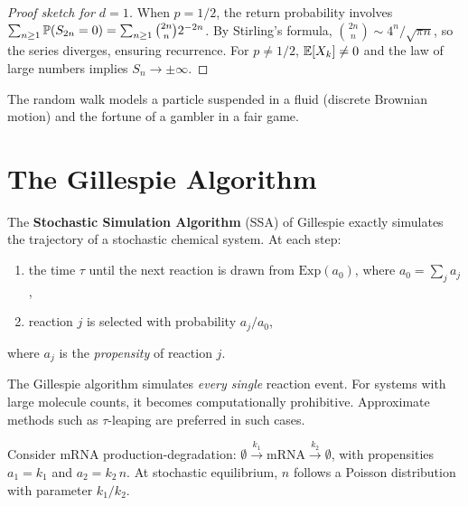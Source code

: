 \begin{proof}[Proof sketch for $d=1$]
When $p = 1/2$, the return probability involves
$\sum_{n \geq 1} \mathbb{P}(S_{2n} = 0) = \sum_{n \geq 1} \binom{2n}{n} 2^{-2n}$.
By Stirling's formula, $\binom{2n}{n} \sim 4^n/\sqrt{\pi n}$, so the
series diverges, ensuring recurrence. For $p \neq 1/2$, $\mathbb{E}[X_k] \neq 0$
and the law of large numbers implies $S_n \to \pm\infty$.
\end{proof}

\begin{example}
The random walk models a particle suspended in a fluid (discrete Brownian
motion) and the fortune of a gambler in a fair game.
\end{example}

\section{The Gillespie Algorithm}
\label{sec:gillespie}

\begin{definition}
The \textbf{Stochastic Simulation Algorithm} (SSA) of Gillespie exactly
simulates the trajectory of a stochastic chemical system. At each step:
\begin{enumerate}
  \item the time $\tau$ until the next reaction is drawn from
    $\text{Exp}(a_0)$, where $a_0 = \sum_j a_j$,
  \item reaction $j$ is selected with probability $a_j / a_0$,
\end{enumerate}
where $a_j$ is the \emph{propensity} of reaction $j$.
\end{definition}

\begin{attention}
The Gillespie algorithm simulates \emph{every single} reaction event.
For systems with large molecule counts, it becomes computationally
prohibitive. Approximate methods such as $\tau$-leaping
are preferred in such cases.
\end{attention}

\begin{example}
Consider mRNA production-degradation: $\emptyset \xrightarrow{k_1}
\text{mRNA} \xrightarrow{k_2} \emptyset$, with propensities $a_1 = k_1$
and $a_2 = k_2\,n$. At stochastic equilibrium, $n$ follows a Poisson
distribution with parameter $k_1/k_2$.
\end{example}


